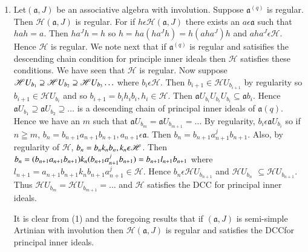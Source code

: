 \begin{examples*}
\begin{enumerate}
\item Let\pageoriginale $(\mathfrak{a}, J)$ be an associative algebra
  with involution. Suppose $\mathfrak{a}^{(q)}$ is regular. Then
  $\mathscr{H}(\mathfrak{a}, J)$ is regular. For if $h\epsilon
  \mathscr{H}(\mathfrak{a}, J)$ there exists an $a\epsilon
  \mathfrak{a}$ such that $hah=a$. Then $ha^{J}h=h$ so
  $h=ha(ha^{J}h)=h(aha^{J})h$ and $aha^{J}\epsilon \mathscr{H}$. Hence
  $\mathscr{H}$ is regular. We note next that if $\mathfrak{a}^{(q)}$
  is regular and satisifies the descending chain condition for
  principle inner ideals then $\mathscr{H}$ satisfies these
  conditions. We have seen that $\mathscr{H}$ is regular. Now suppose
  $\mathscr{H}U_{b_1}\supseteq \mathscr{H}
  U_{b_{2}}\supseteq\mathscr{H}\break U_{b_{3}}\ldots$ where $b_i\epsilon
  \mathscr{H}$. Then $b_{i+1}\in \mathscr{H}U_{b_{i+1}}$ by
  regularity so $b_{i+1}\in \mathscr{H}U_{b_{i}}$ and so
  $b_{i+1}=b_ih_ib_i,h_i\in \mathscr{H}$. Then
  $\mathfrak{a}U_{b_i}U_{b_i}U_{b_i}\subseteq \mathfrak{a}b_i$. Hence
  $\mathfrak{a}U_{b_1}\supseteq\mathfrak{a} U_{b_2}\supseteq\ldots$ is
  a descending chain of principal inner ideals of
  $\mathfrak{a}(q)$. Hence we have an $m$ such that
  $\mathfrak{a}U_{b_m}=\mathfrak{a}U_{b_{m+1}}=\ldots$ By regularity,
  $b_i\epsilon \mathfrak{a}U_{b_i}$ so if $n\geqq m$,
  $b_n=b_{n+1}a_{n+1}b_{n+1},a_{n+1}\epsilon \mathfrak{a}$. Then
  $b_n=b_{n+1}a_{n+1}^j b_{n+1}$. Also, by regularity of $\mathscr{H}$,
  $b_n=b_nk_nb_n,\break k_n\epsilon \mathscr{H}$. Then
  $b_n=(b_{n+1}a_{n+1}b_{n+1})k_n(b_{n+1}a_{n+1}^jb_{n+1})=b_{n+1}l_{n+1}\break
  b_{n+1}$
  where $l_{n+1}=a_{n+1}b_{n+1}k_nb_{n+1}a_{n+1}^j \in
  \mathscr{H}$. Hence $b_n\epsilon \mathscr{H}U_{b_{n+1}}$ and
  $\mathscr{H}U_{b_{n}}$ $\subseteq \mathscr{H}U_{b_{n+1}}$. Thus
  $\mathscr{H}U_{b_m}=\mathscr{H}U_{b_{m+1}}=\ldots$ and $\mathscr{H}$
  satisfies the DCC for principal inner ideals.

It is clear from (1) and the foregoing results that if
$(\mathfrak{a},J)$ is semi-simple Artinian with involution then
$\mathscr{H}(\mathfrak{a},J)$ is regular and satisfies the DCCfor
principal inner ideals.


\end{enumerate}
\end{examples*}
